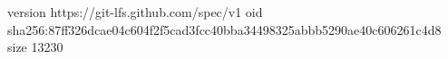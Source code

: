 version https://git-lfs.github.com/spec/v1
oid sha256:87ff326dcae04c604f2f5cad3fcc40bba34498325abbb5290ae40c606261c4d8
size 13230
